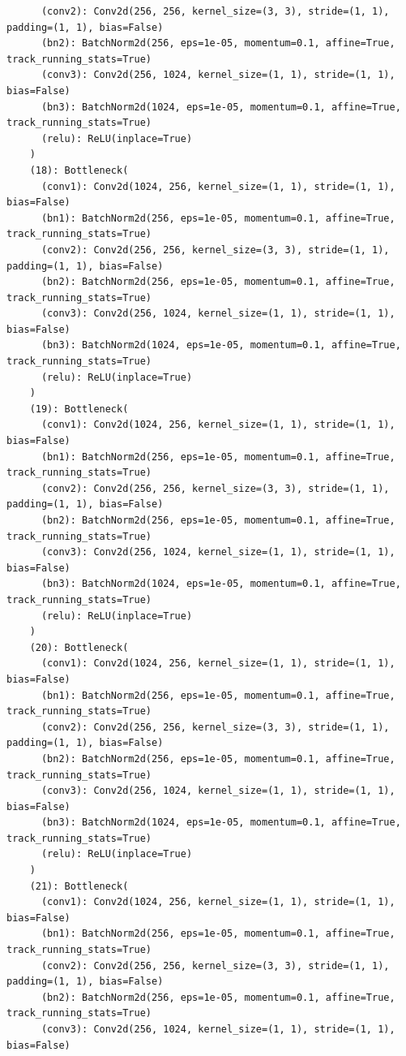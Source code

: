 \documentclass{article}
\begin{document}
\begin{verbatim}
      (conv2): Conv2d(256, 256, kernel_size=(3, 3), stride=(1, 1), padding=(1, 1), bias=False)
      (bn2): BatchNorm2d(256, eps=1e-05, momentum=0.1, affine=True, track_running_stats=True)
      (conv3): Conv2d(256, 1024, kernel_size=(1, 1), stride=(1, 1), bias=False)
      (bn3): BatchNorm2d(1024, eps=1e-05, momentum=0.1, affine=True, track_running_stats=True)
      (relu): ReLU(inplace=True)
    )
    (18): Bottleneck(
      (conv1): Conv2d(1024, 256, kernel_size=(1, 1), stride=(1, 1), bias=False)
      (bn1): BatchNorm2d(256, eps=1e-05, momentum=0.1, affine=True, track_running_stats=True)
      (conv2): Conv2d(256, 256, kernel_size=(3, 3), stride=(1, 1), padding=(1, 1), bias=False)
      (bn2): BatchNorm2d(256, eps=1e-05, momentum=0.1, affine=True, track_running_stats=True)
      (conv3): Conv2d(256, 1024, kernel_size=(1, 1), stride=(1, 1), bias=False)
      (bn3): BatchNorm2d(1024, eps=1e-05, momentum=0.1, affine=True, track_running_stats=True)
      (relu): ReLU(inplace=True)
    )
    (19): Bottleneck(
      (conv1): Conv2d(1024, 256, kernel_size=(1, 1), stride=(1, 1), bias=False)
      (bn1): BatchNorm2d(256, eps=1e-05, momentum=0.1, affine=True, track_running_stats=True)
      (conv2): Conv2d(256, 256, kernel_size=(3, 3), stride=(1, 1), padding=(1, 1), bias=False)
      (bn2): BatchNorm2d(256, eps=1e-05, momentum=0.1, affine=True, track_running_stats=True)
      (conv3): Conv2d(256, 1024, kernel_size=(1, 1), stride=(1, 1), bias=False)
      (bn3): BatchNorm2d(1024, eps=1e-05, momentum=0.1, affine=True, track_running_stats=True)
      (relu): ReLU(inplace=True)
    )
    (20): Bottleneck(
      (conv1): Conv2d(1024, 256, kernel_size=(1, 1), stride=(1, 1), bias=False)
      (bn1): BatchNorm2d(256, eps=1e-05, momentum=0.1, affine=True, track_running_stats=True)
      (conv2): Conv2d(256, 256, kernel_size=(3, 3), stride=(1, 1), padding=(1, 1), bias=False)
      (bn2): BatchNorm2d(256, eps=1e-05, momentum=0.1, affine=True, track_running_stats=True)
      (conv3): Conv2d(256, 1024, kernel_size=(1, 1), stride=(1, 1), bias=False)
      (bn3): BatchNorm2d(1024, eps=1e-05, momentum=0.1, affine=True, track_running_stats=True)
      (relu): ReLU(inplace=True)
    )
    (21): Bottleneck(
      (conv1): Conv2d(1024, 256, kernel_size=(1, 1), stride=(1, 1), bias=False)
      (bn1): BatchNorm2d(256, eps=1e-05, momentum=0.1, affine=True, track_running_stats=True)
      (conv2): Conv2d(256, 256, kernel_size=(3, 3), stride=(1, 1), padding=(1, 1), bias=False)
      (bn2): BatchNorm2d(256, eps=1e-05, momentum=0.1, affine=True, track_running_stats=True)
      (conv3): Conv2d(256, 1024, kernel_size=(1, 1), stride=(1, 1), bias=False)

\end{verbatim}
\end{document}
